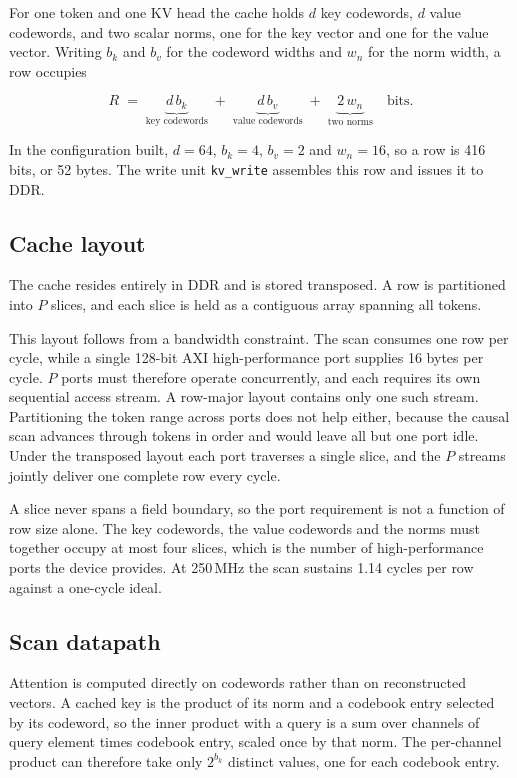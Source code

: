 For one token and one KV head the cache holds $d$ key codewords, $d$
value codewords, and two scalar norms, one for the key vector and one
for the value vector. Writing $b_k$ and $b_v$ for the codeword widths
and $w_n$ for the norm width, a row occupies

\begin{equation}
  R \;=\;
  \underbrace{d\,b_k}_{\text{key codewords}} \;+\;
  \underbrace{d\,b_v}_{\text{value codewords}} \;+\;
  \underbrace{2\,w_n}_{\text{two norms}}
  \quad \text{bits.}
  \label{eq:row}
\end{equation}

In the configuration built, $d{=}64$, $b_k{=}4$, $b_v{=}2$ and
$w_n{=}16$, so a row is 416 bits, or 52 bytes. The write unit
\texttt{kv\_write} assembles this row and issues it to DDR.

\subsection{Cache layout}

The cache resides entirely in DDR and is stored transposed. A row is
partitioned into $P$ slices, and each slice is held as a contiguous
array spanning all tokens.

This layout follows from a bandwidth constraint. The scan consumes one
row per cycle, while a single 128-bit AXI high-performance port supplies
16 bytes per cycle. $P$ ports must therefore operate concurrently, and
each requires its own sequential access stream. A row-major layout
contains only one such stream. Partitioning the token range across ports
does not help either, because the causal scan advances through tokens in
order and would leave all but one port idle. Under the transposed layout
each port traverses a single slice, and the $P$ streams jointly deliver
one complete row every cycle.

A slice never spans a field boundary, so the port requirement is not a
function of row size alone. The key codewords, the value codewords and
the norms must together occupy at most four slices, which is the number
of high-performance ports the device provides. At 250\,MHz the scan
sustains 1.14 cycles per row against a one-cycle ideal.

\subsection{Scan datapath}

Attention is computed directly on codewords rather than on reconstructed
vectors. A cached key is the product of its norm and a codebook entry
selected by its codeword, so the inner product with a query is a sum
over channels of query element times codebook entry, scaled once by that
norm. The per-channel product can therefore take only $2^{b_k}$ distinct
values, one for each codebook entry.

